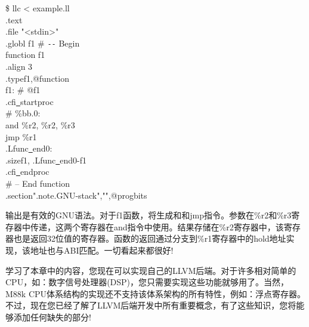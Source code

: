 \begin{tcolorbox}[colback=white,colframe=black]
\$ llc < example.ll \\
\hspace*{1cm}.text \\
\hspace*{1cm}.file \hspace{0.8cm}"<stdin>" \\
\hspace*{1cm}.globl \hspace{0.5cm}f1 \hspace{6cm} \# \verb|--| Begin \\
function f1 \\
\hspace*{1cm}.align \hspace{0.5cm} 3 \\
\hspace*{1cm}.type\hspace{0.8cm}f1,@function \\
f1: \hspace{8cm} \# @f1 \\
\hspace*{1cm}.cfi\underline{~}startproc \\
\# \%bb.0: \\
\hspace*{1cm}and \%r2, \%r2, \%r3 \\
\hspace*{1cm}jmp \%r1 \\
.Lfunc\underline{~}end0: \\
\hspace*{1cm}.size\hspace{1cm}f1, .Lfunc\underline{~}end0-f1 \\
\hspace*{1cm}.cfi\underline{~}endproc \\
\hspace*{8.8cm}\# -- End function \\
\hspace*{1cm}.section\hspace{1cm}".note.GNU-stack","",@progbits
\end{tcolorbox}

输出是有效的GNU语法。对于f1函数，将生成和和jmp指令。参数在\%r2和\%r3寄存器中传递，这两个寄存器在and指令中使用。结果存储在\%r2寄存器中，该寄存器也是返回32位值的寄存器。函数的返回通过分支到\%r1寄存器中的hold地址实现，该地址也与ABI匹配。一切看起来都很好!\par

学习了本章中的内容，您现在可以实现自己的LLVM后端。对于许多相对简单的CPU，如：数字信号处理器(DSP)，您只需要实现这些功能就够用了。当然，M88k CPU体系结构的实现还不支持该体系架构的所有特性，例如：浮点寄存器。不过，现在您已经了解了LLVM后端开发中所有重要概念，有了这些知识，您将能够添加任何缺失的部分!\par















